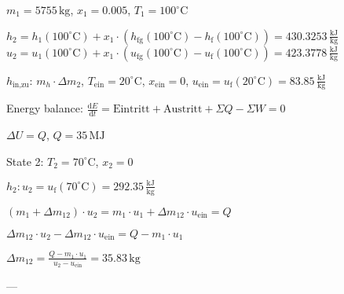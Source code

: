 \( m_1 = 5755 \, \text{kg} \), \( x_1 = 0.005 \), \( T_1 = 100^\circ \text{C} \)  

\( h_2 = h_1(100^\circ \text{C}) + x_1 \cdot (h_\text{fg}(100^\circ \text{C}) - h_\text{f}(100^\circ \text{C})) = 430.3253 \, \frac{\text{kJ}}{\text{kg}} \)  
\( u_2 = u_1(100^\circ \text{C}) + x_1 \cdot (u_\text{fg}(100^\circ \text{C}) - u_\text{f}(100^\circ \text{C})) = 423.3778 \, \frac{\text{kJ}}{\text{kg}} \)  

\( h_\text{in,zu} \): \( m_h \cdot \Delta m_2 \), \( T_\text{ein} = 20^\circ \text{C} \), \( x_\text{ein} = 0 \), \( u_\text{ein} = u_\text{f}(20^\circ \text{C}) = 83.85 \, \frac{\text{kJ}}{\text{kg}} \)  

Energy balance:  
\( \frac{\text{d}E}{\text{d}t} = \text{Eintritt} + \text{Austritt} + \Sigma Q - \Sigma W = 0 \)  

\( \Delta U = Q \), \( Q = 35 \, \text{MJ} \)  

State 2:  
\( T_2 = 70^\circ \text{C} \), \( x_2 = 0 \)  

\( h_2: u_2 = u_\text{f}(70^\circ \text{C}) = 292.35 \, \frac{\text{kJ}}{\text{kg}} \)  

\( (m_1 + \Delta m_{12}) \cdot u_2 = m_1 \cdot u_1 + \Delta m_{12} \cdot u_\text{ein} = Q \)  

\( \Delta m_{12} \cdot u_2 - \Delta m_{12} \cdot u_\text{ein} = Q - m_1 \cdot u_1 \)  

\( \Delta m_{12} = \frac{Q - m_1 \cdot u_1}{u_2 - u_\text{ein}} = 35.83 \, \text{kg} \)  

---